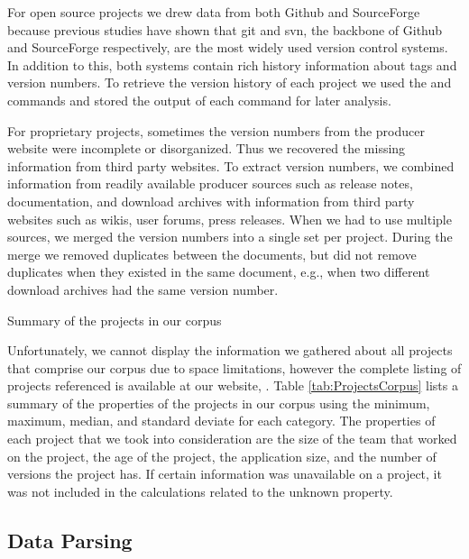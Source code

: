 \documentclass[conference]{IEEEtran}
\begin{document}
For open source projects we drew data from both Github and SourceForge because previous studies \cite{brindescu2014} have shown that git and svn, the backbone of Github and SourceForge respectively, are the most widely used version control systems. In addition to this, both systems contain rich history information about tags and version numbers. To retrieve the version history of each project we used the  and  
commands and stored the output of each command for later analysis.

For proprietary projects, sometimes the version numbers from the producer website
were incomplete or disorganized. Thus we recovered the missing information from third party websites.
To extract version numbers, we combined information from readily available producer sources such as release notes, documentation, and download archives
with information from third party websites such as wikis, user forums, press releases.
When we had to use multiple sources, we merged the version numbers into a single set per project. During the merge we removed duplicates between the documents, but did not remove duplicates when they existed in the same document, e.g., when two different download archives had the same version number.

\begin{table*}[t]
\begin{adjustbox}{width=\textwidth}
\end{adjustbox}
\caption{Summary of the projects in our corpus}
\label{tab:ProjectsCorpus}
\end{table*}

Unfortunately, we cannot display the information we gathered about all \TotalNumProjects projects that comprise our corpus due to space limitations, however the complete listing of projects referenced is available at our website, \website.
Table \ref{tab:ProjectsCorpus} lists a summary of the properties of the projects in our corpus using the minimum, maximum, median, and standard deviate for each category. 
The properties of each project that we took into consideration are the size of the team that worked on the project, the age of the project, the application size, and the number of versions the project has. 
If certain information was unavailable on a project, it was not included in the calculations related to the unknown property.

\subsection{Data Parsing}
\end{document}
